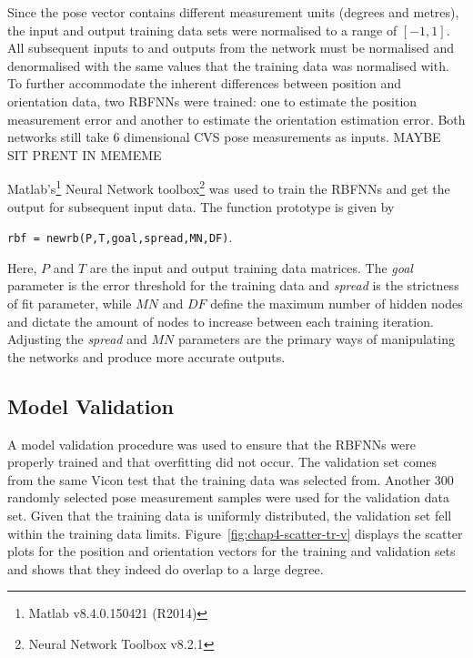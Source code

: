 Since the pose vector contains different measurement units (degrees and metres), the input and output training data sets were normalised to a range of $[-1, 1]$. All subsequent inputs to and outputs from the network must be normalised and denormalised with the same values that the training data was normalised with. To further accommodate the inherent differences between position and orientation data, two RBFNNs were trained: one to estimate the position measurement error and another to estimate the orientation estimation error. Both networks still take 6 dimensional CVS pose measurements as inputs. MAYBE SIT PRENT IN MEMEME

Matlab's\footnote{Matlab v8.4.0.150421 (R2014)} Neural Network toolbox\footnote{Neural Network Toolbox v8.2.1} was used to train the RBFNNs and get the output for subsequent input data. The function prototype is given by 

\begin{center}
  \verb|rbf = newrb(P,T,goal,spread,MN,DF)|.
\end{center}

Here, $P$ and $T$ are the input and output training data matrices. The \emph{goal} parameter is the error threshold for the training data and \emph{spread} is the strictness of fit parameter, while $\mathit{MN}$ and $\mathit{DF}$ define the maximum number of hidden nodes and dictate the amount of nodes to increase between each training iteration. Adjusting the \emph{spread} and $\mathit{MN}$ parameters are the primary ways of manipulating the networks and produce more accurate outputs. 

\subsection{Model Validation}

A model validation procedure was used to ensure that the RBFNNs were properly trained and that overfitting did not occur. The validation set comes from the same Vicon test that the training data was selected from. Another 300 randomly selected pose measurement samples were used for the validation data set. Given that the training data is uniformly distributed, the validation set fell within the training data limits. Figure~\ref{fig:chap4-scatter-tr-v} displays the scatter plots for the position and orientation vectors for the training and validation sets and shows that they indeed do overlap to a large degree. 

